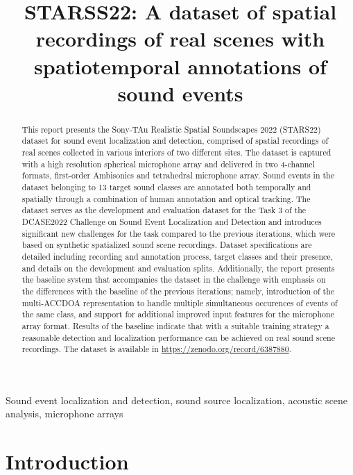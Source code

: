 \documentclass{article}
\title{STARSS22: A dataset of spatial recordings of real scenes with spatiotemporal annotations of sound events}
\begin{document}
\ninept
\maketitle

\begin{sloppy}

\begin{abstract}
This report presents the Sony-TAu Realistic Spatial Soundscapes 2022 (STARS22) dataset for sound event localization and detection, comprised of spatial recordings of real scenes collected in various interiors of two different sites. The dataset is captured with a high resolution spherical microphone array and delivered in two 4-channel formats, first-order Ambisonics and tetrahedral microphone array. Sound events in the dataset belonging to 13 target sound classes are annotated both temporally and spatially through a combination of human annotation and optical tracking. The dataset serves as the development and evaluation dataset for the Task 3 of the DCASE2022 Challenge on Sound Event Localization and Detection and introduces significant new challenges for the task compared to the previous iterations, which were based on synthetic spatialized sound scene recordings. Dataset specifications are detailed including recording and annotation process, target classes and their presence, and details on the development and evaluation splits. Additionally, the report presents the baseline system that accompanies the dataset in the challenge with emphasis on the differences with the baseline of the previous iterations; namely, introduction of the multi-ACCDOA representation to handle multiple simultaneous occurences of events of the same class, and support for additional improved input features for the microphone array format. Results of the baseline indicate that with a suitable training strategy a reasonable detection and localization performance can be achieved on real sound scene recordings. The dataset is available in \url{https://zenodo.org/record/6387880}.
\end{abstract}


\begin{keywords}
Sound event localization and detection, sound source localization, acoustic scene analysis, microphone arrays
\end{keywords}


\section{Introduction}
\label{sec:intro}


\end{sloppy}
\end{document}
